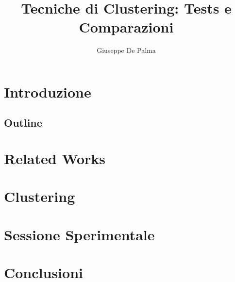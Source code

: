 \documentclass{article}
\title{Tecniche di Clustering: Tests e Comparazioni}
\author{Giuseppe De Palma}
\date{}
\begin{document}
    \maketitle
    
    \section{Introduzione}
    \subsection{Outline}
    \section{Related Works}
    \section{Clustering}
    \section{Sessione Sperimentale}
    \section{Conclusioni}
		
		

    
\end{document}

